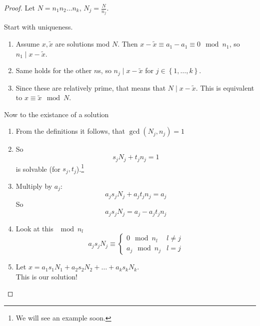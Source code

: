 \documentclass[english]{lbscript}
\begin{document}
\begin{proof}
	Let \(N=n_1 n_2 \dots n_k\), \(N_j=\frac{N}{n_j}\).

	Start with uniqueness.
	\begin{enumerate}
		\item\label{item:67} Assume \(x, \tilde{x}\) are solutions mod \(N\). Then \(x-\tilde{x}≡a_1-a_1 ≡0 \mod n_1\), so \(n_1 \mid x-\tilde{x}\).
		\item\label{item:68} Same holds for the other \(n\)s, so \(n_j \mid x-\tilde{x}\) for \(j∈\left\{ 1, \dots, k \right\} \).
		\item\label{item:69} Since these are relatively prime, that means that \(N \mid x - \tilde{x}\). This is equivalent to \(x≡\tilde{x} \mod N\).
	\end{enumerate}

	Now to the existance of a solution
	\begin{enumerate}
		\item\label{item:70} From the definitions it follows, that \(\gcd(N_j, n_j)=1\)
		\item\label{item:71} So
		\begin{equation}
			\label{eq:121}
			s_j N_j + t_j n_j = 1
		\end{equation}
		is solvable (for \(s_j, t_j\)).\footnote{We will see an example soon.}
		\item\label{item:72} Multiply by \(a_j\):
		\begin{equation}
			\label{eq:122}
			a_j s_j N_j + a_j t_j n_j = a_j
		\end{equation}
		So
		\begin{equation}
			\label{eq:123}
			a_j s_j N_j = a_j - a_j t_j n_j
		\end{equation}
		\item\label{item:73} Look at this \(\mod n_l\)
		\begin{equation}
			\label{eq:124}
			a_j s_j N_j ≡
			\begin{cases}
				0 \mod n_{l} & l≠j \\ a_j \mod n_j & l=j
			\end{cases}
		\end{equation}
		\item\label{item:74} Let \(x=a_1s_1N_1+a_2s_2N_2+\dots+a_k s_k N_k\). \\
		This is our solution!
	\end{enumerate}
\end{proof}
\end{document}
